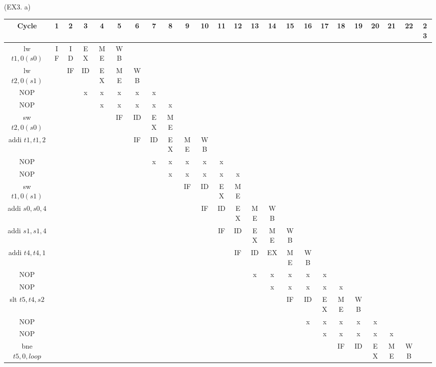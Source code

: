 \documentclass[12pt, a4paper]{article}
\begin{document}
\begin{enumerate}
    \begin{table}{(EX3. a)}
      \begin{tabular}{|c|*{23}{c|}}
      \hline
      Cycle & 1 & 2 & 3 & 4 & 5 & 6 & 7 & 8 & 9 & 10 & 11 & 12 & 13 & 14 & 15 & 16 & 17 & 18 & 19 & 20 & 21 & 22 & 23 \\
      \hline
      lw $t1, 0(s0)$ & IF & ID & EX & ME & WB & & & & & & & & & & & & & & & & & & \\
      \hline
      lw $t2, 0(s1)$ & & IF & ID & EX & ME & WB & & & & & & & & & & & & & & & & & \\
      \hline
      NOP & & & x & x & x & x & x & & & & & & & & & & & & & & & & \\
      \hline
      NOP & & & & x & x & x & x & x & & & & & & & & & & & & & & & \\
      \hline
      sw $t2, 0(s0)$ & & & & & IF & ID & EX & ME & & & & & & & & & & & & & & & \\
      \hline
      addi $t1, t1, 2$ & & & & & & IF & ID & EX & ME & WB & & & & & & & & & & & & & \\
      \hline
      NOP & & & & & & & x & x & x & x & x & & & & & & & & & & & & \\
      \hline
      NOP & & & & & & & & x & x & x & x & x & & & & & & & & & & & \\
      \hline
      sw $t1, 0(s1)$ & & & & & & & & & IF & ID & EX & ME & & & & & & & & & & & \\
      \hline
      addi $s0, s0, 4$ & & & & & & & & & & IF & ID & EX & ME & WB & & & & & & & & & \\
      \hline
      addi $s1, s1, 4$ & & & & & & & & & & & IF & ID & EX & ME & WB & & & & & & & & \\
      \hline
      addi $t4, t4, 1$ & & & & & & & & & & & & IF & ID & EX & ME & WB & & & & & & & \\
      \hline
      NOP & & & & & & & & & & & & & x & x & x & x & x & & & & & & \\
      \hline
      NOP & & & & & & & & & & & & & & x & x & x & x & x & & & & & \\
      \hline
      slt $t5, t4, s2$ & & & & & & & & & & & & & & & IF & ID & EX & ME & WB & & & & \\
      \hline
      NOP & & & & & & & & & & & & & & & & x & x & x & x & x & & & \\
      \hline
      NOP & & & & & & & & & & & & & & & & & x & x & x & x & x & & \\
      \hline
      bne $t5, 0, loop$ & & & & & & & & & & & & & & & & & & IF & ID & EX & ME & WB & \\
      \hline
      \end{tabular}
      \end{table}
      

\end{enumerate}
\end{document}
